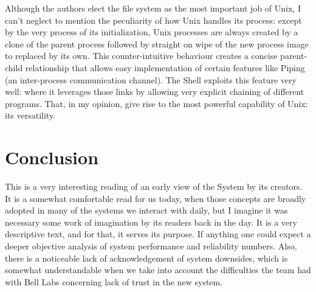 \documentclass[12pt]{article}
\begin{document}
Although the authors elect the file system as the most important job of Unix, I can't neglect to mention the peculiarity of how Unix handles its process: except by the very process of its initialization, Unix processes are always created by a clone of the parent process followed by straight on wipe of the new process image to replaced by its own. This counter-intuitive behaviour creates a concise parent-child relationship that allows easy implementation of certain features like Piping (an inter-process communication channel). The Shell exploits this feature very well:  where it leverages those links by allowing very explicit chaining of different programs. That, in my opinion, give rise to the most powerful capability of Unix: its versatility.

\pagebreak
\section{Conclusion}

This is a very interesting reading of an early view of the System by its creators. It is a somewhat comfortable read for us today, when those concepts are broadly adopted in many of the systems we interact with daily, but I imagine it was necessary some work of imagination by its readers back in the day. It is a very descriptive text, and for that, it serves its purpose. If anything one could expect a deeper objective analysis of system performance and reliability numbers. Also, there is a noticeable lack of acknowledgement of system downsides, which is somewhat understandable when we take into account the difficulties the team had with Bell Labs concerning lack of trust in the new system.



\end{document}
